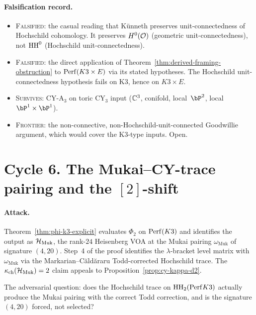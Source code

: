 \paragraph{Falsification record.}
\begin{itemize}
\item
\textsc{Falsified}: the casual reading that K\"unneth preserves
unit-connectedness of Hochschild cohomology. It preserves
$H^0(\mathcal{O})$ (geometric unit-connectedness), not $\mathrm{HH}^0$
(Hochschild unit-connectedness).

\item
\textsc{Falsified}: the direct application of
Theorem~\ref{thm:derived-framing-obstruction} to
$\mathrm{Perf}(K3 \times E)$ via its stated hypotheses. The
Hochschild unit-connectedness hypothesis fails on K3, hence on
$K3 \times E$.

\item
\textsc{Survives}: CY-A$_3$ on toric CY$_3$ input ($\mathbb{C}^3$,
conifold, local~$\bP^2$, local~$\bP^1 \times \bP^1$).

\item
\textsc{Frontier}: the non-connective, non-Hochschild-unit-connected
Goodwillie argument, which would cover the K3-type inputs. Open.
\end{itemize}

\section*{Cycle 6. The Mukai--CY-trace pairing and the $[2]$-shift}

\paragraph{Attack.} Theorem~\ref{thm:phi-k3-explicit} evaluates
$\Phi_2$ on $\mathrm{Perf}(K3)$ and identifies the output as
$\mathcal{H}_{\mathrm{Muk}}$, the rank-$24$ Heisenberg VOA at the Mukai
pairing $\omega_{\mathrm{Muk}}$ of signature $(4, 20)$. Step~4 of
the proof identifies the $\lambda$-bracket level matrix with
$\omega_{\mathrm{Muk}}$ via the Markarian--C\u{a}ld\u{a}raru
Todd-corrected Hochschild trace. The $\kappa_{\mathrm{ch}}(\mathcal{H}_{\mathrm{Muk}}) = 2$
claim appeals to Proposition~\ref{prop:cy-kappa-d2}.

The adversarial question: does the Hochschild trace on
$\mathrm{HH}_2(\mathrm{Perf} K3)$ actually produce the Mukai pairing with the
correct Todd correction, and is the signature $(4, 20)$ forced,
not selected?

